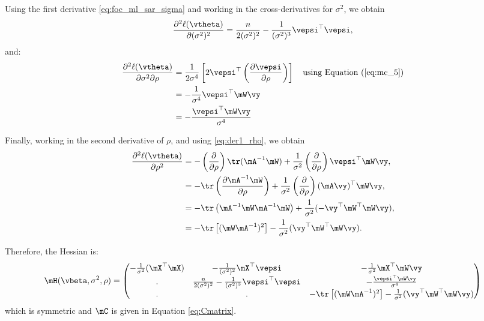 Using the first derivative \eqref{eq:foc_ml_sar_sigma} and working in the cross-derivatives for $\sigma^2$, we obtain
\begin{equation}\label{eq:sar_der_sigma_sigma}
	\frac{\partial^2 \ell(\vtheta)}{\partial (\sigma^2)^2}  = \frac{n}{2(\sigma^2) ^2} - \frac{1}{(\sigma^2)^3} \vepsi^\top \vepsi,
\end{equation}
%
and:
\begin{equation}\label{eq:sar_der_sigma_rho}
\begin{aligned}
\frac{\partial^2 \ell(\vtheta) }{\partial \sigma^2 \partial \rho}  & = \frac{1}{2\sigma ^ 4}\left[2\vepsi^\top \left(\frac{\partial \vepsi}{\partial \rho}\right)\right] \quad \mbox{using Equation (\ref{eq:mc_5})}\\
& =  - \frac{1}{\sigma ^ 4}\vepsi ^\top \mW\vy \\
& =  -\frac{\vepsi^\top\mW\vy}{\sigma ^ 4}
\end{aligned}
\end{equation}

Finally, working in the second derivative of $\rho$, and using \eqref{eq:der1_rho}, we obtain
\begin{equation}\label{eq:sar_der_rho_rho}
\begin{aligned}
\frac{\partial^2 \ell(\vtheta) }{\partial \rho ^2}  & = -\left(\frac{\partial }{\partial \rho}\right)\tr(\mA^{-1}\mW) + \frac{1}{\sigma^2}\left(\frac{\partial }{\partial \rho}\right)\vepsi^\top\mW\vy, \\
& = - \tr\left( \frac{\partial \mA^{-1}\mW}{\partial \rho}\right) + \frac{1}{\sigma^2}\left(\frac{\partial }{\partial \rho}\right)(\mA\vy)^\top\mW\vy, \\
& = - \tr\left( \mA^{-1}\mW\mA^{-1}\mW \right)+ \frac{1}{\sigma^2}(- \vy^{\top}\mW^{\top}\mW\vy), \\
& = - \tr\left[(\mW\mA^{-1})^2\right] - \frac{1}{\sigma^2}(\vy^{\top}\mW^{\top}\mW\vy).
\end{aligned}
\end{equation}


Therefore, the Hessian is:
\begin{equation}\label{eq:hessian_sml}
	\mH(\vbeta, \sigma^2, \rho) = 
	\begin{pmatrix}
	- \frac{1}{\sigma^2}(\mX^\top \mX) & - \frac{1}{(\sigma^2)^2} \mX^\top \vepsi & - \frac{1}{\sigma^2} \mX^\top \mW\vy \\
		 .& \frac{n}{2(\sigma^2) ^2} - \frac{1}{(\sigma^2)^3} \vepsi^\top \vepsi & -\frac{\vepsi^\top\mW\vy}{\sigma ^ 4} \\
		 .& . & - \tr\left[(\mW\mA^{-1})^2\right] - \frac{1}{\sigma^2}(\vy^{\top}\mW^{\top}\mW\vy)
	\end{pmatrix} 
\end{equation}
%
which is symmetric and $\mC$ is given in Equation \eqref{eq:Cmatrix}.

